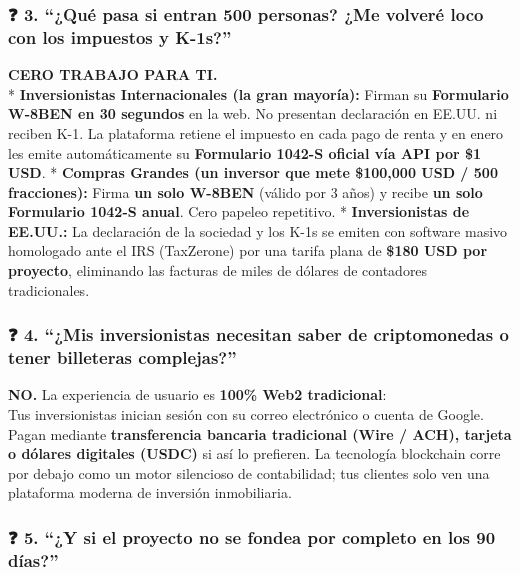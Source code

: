 \documentclass[
]{article}
\renewenvironment{quote}{%
  \vspace{0.4em}
  \begin{tcolorbox}[
    colback=bridsLight,
    colframe=bridsBlue,
    arc=2mm,
    boxrule=1.2pt,
    left=10pt,
    right=10pt,
    top=8pt,
    bottom=8pt,
    before skip=6pt,
    after skip=8pt
  ]%
}{%
  \end{tcolorbox}%
}
\begin{document}
\subsubsection{❓ 3. ``¿Qué pasa si entran 500 personas? ¿Me volveré
loco con los impuestos y
K-1s?''}\label{quuxe9-pasa-si-entran-500-personas-me-volveruxe9-loco-con-los-impuestos-y-k-1s}

\begin{quote}
\textbf{CERO TRABAJO PARA TI.}\\
* \textbf{Inversionistas Internacionales (la gran mayoría):} Firman su
\textbf{Formulario W-8BEN en 30 segundos} en la web. No presentan
declaración en EE.UU. ni reciben K-1. La plataforma retiene el impuesto
en cada pago de renta y en enero les emite automáticamente su
\textbf{Formulario 1042-S oficial vía API por \$1 USD}. *
\textbf{Compras Grandes (un inversor que mete \$100,000 USD / 500
fracciones):} Firma \textbf{un solo W-8BEN} (válido por 3 años) y recibe
\textbf{un solo Formulario 1042-S anual}. Cero papeleo repetitivo. *
\textbf{Inversionistas de EE.UU.:} La declaración de la sociedad y los
K-1s se emiten con software masivo homologado ante el IRS (TaxZerone)
por una tarifa plana de \textbf{\$180 USD por proyecto}, eliminando las
facturas de miles de dólares de contadores tradicionales.
\end{quote}

\subsubsection{❓ 4. ``¿Mis inversionistas necesitan saber de
criptomonedas o tener billeteras
complejas?''}\label{mis-inversionistas-necesitan-saber-de-criptomonedas-o-tener-billeteras-complejas}

\begin{quote}
\textbf{NO.} La experiencia de usuario es \textbf{100\% Web2
tradicional}:\\
Tus inversionistas inician sesión con su correo electrónico o cuenta de
Google. Pagan mediante \textbf{transferencia bancaria tradicional (Wire
/ ACH), tarjeta o dólares digitales (USDC)} si así lo prefieren. La
tecnología blockchain corre por debajo como un motor silencioso de
contabilidad; tus clientes solo ven una plataforma moderna de inversión
inmobiliaria.
\end{quote}

\subsubsection{❓ 5. ``¿Y si el proyecto no se fondea por completo en
los 90
días?''}\label{y-si-el-proyecto-no-se-fondea-por-completo-en-los-90-duxedas}
\end{document}
